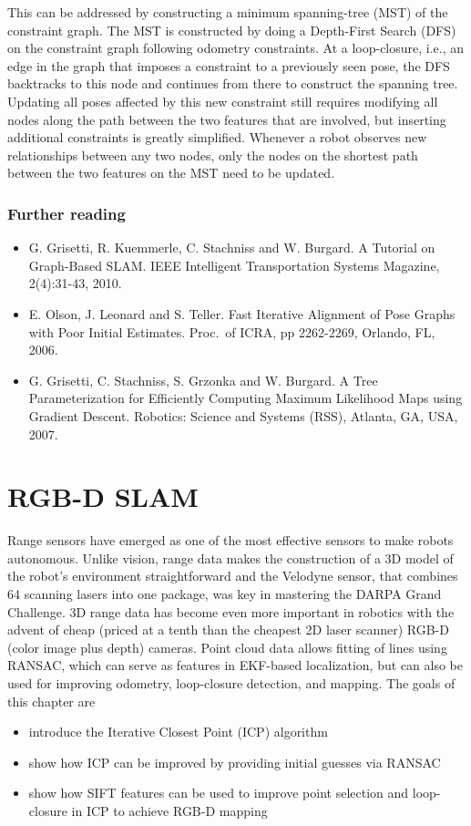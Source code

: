 \documentclass[paper=6.14in:9.21in,pagesize=pdftex,11pt,twoside,openright]{scrbook}
\begin{document}
This can be addressed by constructing a  minimum spanning-tree  (MST) of the constraint graph. The MST is constructed by doing a Depth-First Search (DFS) on the constraint graph following odometry constraints. At a loop-closure, i.e., an edge in the graph that imposes a constraint to a previously seen pose, the DFS backtracks to this node and continues from there to construct the spanning tree. Updating all poses affected by this new constraint still requires modifying all nodes along the path between the two features that are involved, but inserting additional constraints is greatly simplified. Whenever a robot observes new relationships between any two nodes, only the nodes on the shortest path between  the two features on the MST need to be updated. %
\subsection*{Further reading}
\begin{itemize}
\item G. Grisetti, R. Kuemmerle, C. Stachniss and W. Burgard. A Tutorial on Graph-Based SLAM. IEEE Intelligent Transportation Systems Magazine, 2(4):31-43, 2010.

\item E. Olson, J. Leonard and S. Teller. Fast Iterative Alignment of Pose Graphs with Poor Initial Estimates. Proc.\ of ICRA, pp 2262-2269, Orlando, FL, 2006.

\item G. Grisetti, C. Stachniss, S. Grzonka and W. Burgard. A Tree Parameterization for Efficiently Computing Maximum Likelihood Maps using Gradient Descent. Robotics: Science and Systems (RSS), Atlanta, GA, USA, 2007.
\end{itemize}

\chapter{RGB-D SLAM}
 Range sensors have emerged as one of the most effective sensors to make robots autonomous. Unlike vision, range data makes the construction of a 3D model of the robot's environment straightforward and the Velodyne sensor, that combines 64 scanning lasers into one package, was key in mastering the DARPA Grand Challenge.  3D range data has become even more important in robotics with the advent of cheap (priced at a tenth than the cheapest 2D laser scanner) RGB-D (color image plus depth) cameras. Point cloud data allows fitting of lines using RANSAC, which can serve as features in EKF-based localization, but can also be used for improving odometry, loop-closure detection, and mapping. The goals of this chapter are
\begin{itemize}
\item introduce the Iterative Closest Point (ICP) algorithm
\item show how ICP can be improved by providing initial guesses via RANSAC
\item show how SIFT features can be used to improve point selection and loop-closure in ICP to achieve RGB-D mapping
\end{itemize}
\end{document}
